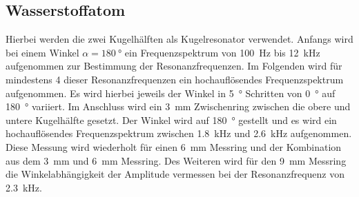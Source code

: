 \subsection{Wasserstoffatom}
Hierbei werden die zwei Kugelhälften als Kugelresonator verwendet. Anfangs wird bei einem Winkel $\alpha = \qty{180}{\degree}$ 
ein Frequenzspektrum von \qty{100}{Hz} bis \qty{12}{kHz} aufgenommen zur Bestimmung der Resonanzfrequenzen.
Im Folgenden wird für mindestens 4 dieser Resonanzfrequenzen ein hochauflösendes Frequenzspektrum aufgenommen. 
Es wird hierbei jeweils der Winkel in \qty{5}{\degree} Schritten von \qty{0}{\degree} auf \qty{180}{\degree} variiert.
Im Anschluss wird ein \qty{3}{mm} Zwischenring zwischen die obere und untere Kugelhälfte gesetzt. Der Winkel wird auf \qty{180}{\degree} 
gestellt und es wird ein hochauflösendes Frequenzspektrum zwischen \qty{1.8}{kHz} und \qty{2.6}{kHz} aufgenommen. Diese Messung wird 
wiederholt für einen \qty{6}{mm} Messring und der Kombination aus dem \qty{3}{mm} und \qty{6}{mm} Messring.
Des Weiteren wird für den \qty{9}{mm} Messring die Winkelabhängigkeit der Amplitude vermessen bei der Resonanzfrequenz von \qty{2.3}{kHz}.


\clearpage